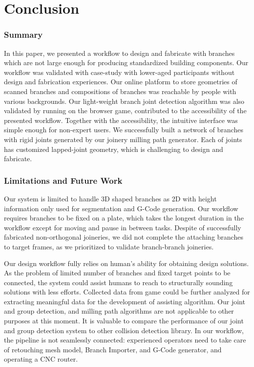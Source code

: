 \section{Conclusion}
\subsubsection{Summary}
In this paper, we presented a workflow to design and fabricate with branches which are not large enough for producing standardized building components.
Our workflow was validated with case-study with lower-aged participants without design and fabrication experiences.
Our online platform to store geometries of scanned branches and compositions of branches was reachable by people with various backgrounds. %
Our light-weight branch joint detection algorithm was also validated by running on the browser game, contributed to the accessibility of the presented workflow.
Together with the accessibility, the intuitive interface was simple enough for non-expert users.
We successfully built a network of branches with rigid joints generated by our joinery milling path generator.
Each of joints has customized lapped-joint geometry, which is challenging to design and fabricate.

\subsubsection{Limitations and Future Work}
Our system is limited to handle 3D shaped branches as 2D with height information only used for segmentation and G-Code generation.
Our workflow requires branches to be fixed on a plate, which takes the longest duration in the workflow except for moving and pause in between tasks.
Despite of successfully fabricated non-orthogonal joineries, we did not complete the attaching branches to target frames, as we prioritized to validate branch-branch joineries.

Our design workflow fully relies on human's ability for obtaining design solutions.
As the problem of limited number of branches and fixed target points to be connected, the system could assist humans to reach to structurally sounding solutions with less efforts.
Collected data from game could be further analyzed for extracting meaningful data for the development of assisting algorithm.
Our joint and group detection, and milling path algorithms are not applicable to other purposes at this moment.
It is valuable to compare the performance of our joint and group detection system to other collision detection library.
In our workflow, the pipeline is not seamlessly connected: experienced operators need to take care of retouching mesh model, Branch Importer, and G-Code generator, and operating a CNC router.
